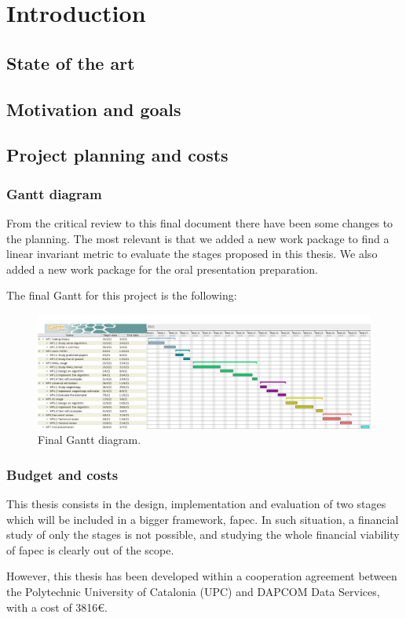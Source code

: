 \chapter{Introduction}
\section{State of the art}

\section{Motivation and goals}

\section{Project planning and costs}
\subsection{Gantt diagram}
From the critical review to this final document there have been some changes to the planning. The most relevant is that we added a new work package to find a linear invariant metric to evaluate the stages proposed in this thesis. We also added a new work package for the oral presentation preparation.

The final Gantt for this project is the following:
\begin{figure}[h!]
	\begin{center}
		\includegraphics[scale=0.255]{images/gantt.png}
	\end{center}
	\caption{Final Gantt diagram.}
	\label{fig:gantt}
\end{figure}

\subsection{Budget and costs}
This thesis consists in the design, implementation and evaluation of two stages which will be included in a bigger framework, \acrshort{fapec}. In such situation, a financial study of only the stages is not possible, and studying the whole financial viability of \acrshort{fapec} is clearly out of the scope.

However, this thesis has been developed within a cooperation agreement between the Polytechnic University of Catalonia (UPC) and DAPCOM Data Services, with a cost of 3816€.


